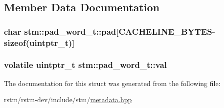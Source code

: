 \subsection{Member Data Documentation}
\hypertarget{structstm_1_1pad__word__t_a7dc4408789052163966860e1312bea81}{
\subsubsection[{pad}]{\setlength{\rightskip}{0pt plus 5cm}char stm\-::pad\-\_\-word\-\_\-t\-::pad\mbox{[}{\bf C\-A\-C\-H\-E\-L\-I\-N\-E\-\_\-\-B\-Y\-T\-E\-S}-\/sizeof(uintptr\-\_\-t)\mbox{]}}}\label{structstm_1_1pad__word__t_a7dc4408789052163966860e1312bea81}
\hypertarget{structstm_1_1pad__word__t_adb34896d04147daf2aa7c67fc82a5247}{
\subsubsection[{val}]{\setlength{\rightskip}{0pt plus 5cm}volatile uintptr\-\_\-t stm\-::pad\-\_\-word\-\_\-t\-::val}}\label{structstm_1_1pad__word__t_adb34896d04147daf2aa7c67fc82a5247}


The documentation for this struct was generated from the following file\-:\begin{DoxyCompactItemize}
\item 
rstm/rstm-\/dev/include/stm/\hyperlink{metadata_8hpp}{metadata.\-hpp}\end{DoxyCompactItemize}
